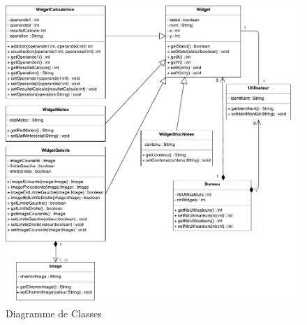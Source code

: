\begin{figure}[H]
	\centering
	\includegraphics[angle=90]{diagrammes/DC.pdf}
	\caption{Diagramme de Classes}
\end{figure}